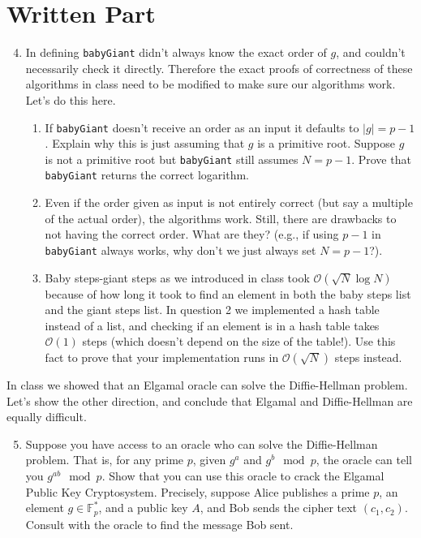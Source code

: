 \documentclass[11pt]{article}
\newcommand{\bF}{\mathbb{F}}
\newcommand{\cO}{\mathcal{O}}
\begin{document}
\section*{Written Part}
\begin{enumerate}
  \setcounter{enumi}{3}
  \item{
  In defining \verb|babyGiant| didn't always know the exact order of $g$, and couldn't necessarily check it directly.  Therefore the exact proofs of correctness of these algorithms in class need to be modified to make sure our algorithms work.  Let's do this here.
  \begin{enumerate}
    \item{
    If \verb|babyGiant| doesn't receive an order as an input it defaults to $|g| = p-1$.  Explain why this is just assuming that $g$ is a primitive root.  Suppose $g$ is not a primitive root but \verb|babyGiant| still assumes $N=p-1$.  Prove that \verb|babyGiant| returns the correct logarithm.
    }
    \item{
    Even if the order given as input is not entirely correct (but say a multiple of the actual order), the algorithms work.  Still, there are drawbacks to not having the correct order.  What are they?  (e.g., if using $p-1$ in \verb|babyGiant| always works, why don't we just always set $N=p-1$?).
    }
    \item{
    Baby steps-giant steps as we introduced in class took $\cO(\sqrt N\log N)$ because of how long it took to find an element in both the baby steps list and the giant steps list.  In question 2 we implemented a hash table instead of a list, and checking if an element is in a hash table takes $\cO(1)$ steps (which doesn't depend on the size of the table!).  Use this fact to prove that your implementation runs in $\cO(\sqrt N)$ steps instead.
    }
  \end{enumerate}
  }
\end{enumerate}
In class we showed that an Elgamal oracle can solve the Diffie-Hellman problem.  Let's show the other direction, and conclude that Elgamal and Diffie-Hellman are equally difficult.
\begin{enumerate}
  \setcounter{enumi}{4}
  \item{
  Suppose you have access to an oracle who can solve the Diffie-Hellman problem.  That is, for any prime $p$, given $g^a$ and $g^b\mod p$, the oracle can tell you $g^{ab}\mod p$.  Show that you can use this oracle to crack the Elgamal Public Key Cryptosystem.  Precisely, suppose Alice publishes a prime $p$, an element $g\in\bF_p^*$, and a public key $A$, and Bob sends the cipher text $(c_1,c_2)$.  Consult with the oracle to find the message Bob sent.
  }
\end{enumerate}
\end{document}
